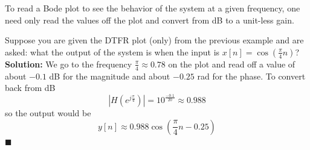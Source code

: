 To read a Bode plot to see the behavior of the system at a given frequency, one need only read the values off the plot and convert from dB to a unit-less gain.

\begin{example}
  Suppose you are given the DTFR plot (only) from the previous example and are asked: what the output of the system is when the input is $x[n] = \cos\left(\frac{\pi}{4} n\right)$?\\
  \textbf{Solution:} We go to the frequency $\frac{\pi}{4} \approx 0.78$ on the plot and read off a value of about $-0.1$ dB for the magnitude and about $-0.25$ rad for the phase. To convert back from dB
  \[
  \left|H\left(e^{j\frac{\pi}{4}}\right)\right| = 10^{\frac{-0.1}{20}} \approx 0.988 
  \]
  so the output would be
  \[
  y[n] \approx 0.988\cos\left(\frac{\pi}{4} n  - 0.25\right)
  \]
  $\blacksquare$
\end{example}

